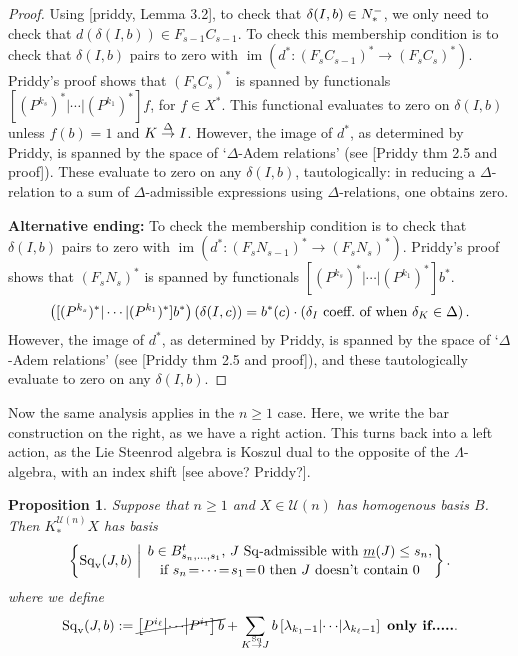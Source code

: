 \documentclass[11pt]{amsart}
\theoremstyle{plain}
\newtheorem{prop}[thm]{Proposition}
\theoremstyle{definition}
\DeclareMathOperator{\im}{im}
\renewcommand{\to}{\longrightarrow}
\newcommand{\calU}{\mathcal{U}}
\theoremstyle{plain}
\newcommand{\deltaalg}{\Delta} %
\newcommand{\minDimSq}{\underline{m}}
\newcommand{\produces}[3]{#3:#1\sim #2}
\renewcommand{\produces}[3]{#1\rightarrow_{#3} #2}%
\renewcommand{\produces}[3]{#1\overset{\smash{#3}}{\rightarrow} #2}%
\newcommand{\Nop}{N^{\smash{-}}}
\newcommand{\Sq}{\mathrm{Sq}}
\begin{document}
\begin{Koszul complexes}
\begin{proof}
Using [priddy, Lemma 3.2], to check that $\delta(I,b)\in\Nop_*$, we only need to check that $d(\delta(I,b))\in F_{s-1}C_{s-1}$.
To check this membership condition is to check that $\delta(I,b)$ pairs to zero with $\im(d^*:(F_sC_{s-1})^*\to(F_sC_s)^*)$. Priddy's proof shows that $(F_sC_s)^*$ is spanned by functionals $[(P^{k_s})^*|\cdots |(P^{k_1})^*]f$, for $f\in X^*$.  This functional evaluates to zero on $\delta(I,b)$ unless $f(b)=1$ and $\produces{K}{I}{\deltaalg}$. However, the image of $d^*$, as determined by Priddy, is spanned by the space of `$\deltaalg$-Adem relations' (see [Priddy thm 2.5 and proof]). These evaluate to zero on any $\delta(I,b)$, tautologically: in reducing a $\deltaalg$-relation to a sum of $\deltaalg$-admissible expressions using $\deltaalg$-relations, one obtains zero.

\textbf{Alternative ending: }To check the membership condition is to check that $\delta(I,b)$ pairs to zero with $\im(d^*:(F_sN_{s-1})^*\to(F_sN_s)^*)$. Priddy's proof shows that $(F_sN_s)^*$ is spanned by functionals $[(P^{k_s})^*|\cdots |(P^{k_1})^*]b^*$. %
\[\left([(P^{k_s})^*|\cdots |(P^{k_1})^*]b^*\right)\left(\delta(I,c)\right)= b^*(c)\cdot\left(\textup{$\delta_I$ coeff.\ of when $\delta_K\in\deltaalg$}\right).\]
However, the image of $d^*$, as determined by Priddy, is spanned by the space of `$\deltaalg$-Adem relations' (see [Priddy thm 2.5 and proof]), and these tautologically evaluate to zero on any $\delta(I,b)$.
\end{proof}
Now the same analysis applies in the $n\geq1$ case. Here, we write the bar construction on the right, as we have a right action. This turns back into a left action, as the Lie Steenrod algebra is Koszul dual to the opposite of the $\Lambda$-algebra, with an index shift [see above? Priddy?].
\begin{prop}\label{propDerivedIndTrivialUobject n at least 1}
Suppose that $n\geq1$ and $X\in\calU(n)$ has homogenous basis $B$. Then $K_*^{\calU(n)}X$ has basis
\[\left\{\Sq_{\textup{v}}(J,b)\ \middle|\ \genfrac{}{}{0pt}{}{b\in B_{s_{n},\ldots,s_1}^t\textup{, $J$ $\Sq$-admissible with }\minDimSq(J)\leq s_n,}{\textup{if }s_{n}\!=\!\cdots\!=\!s_1\!=\!0\textup{ then $J$ doesn't contain 0}}\right\}.\]
where we define
\[\Sq_\textup{v}(J,b):=\cancel{\left[P^{i_\ell}\middle|\cdots\middle|P^{i_1} \right]b}+\sum_{\produces{K}{J}{\Sq}}b\left[\lambda_{k_1-1} \middle|\cdots\middle|\lambda_{k_\ell-1} \right]\textup{ \textbf{only if.....}}.\]

\end{prop}
\end{Koszul complexes}
\end{document}
